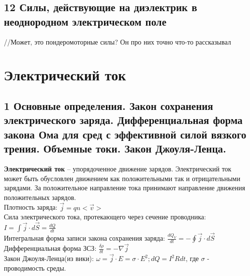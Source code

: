 \documentclass[a4paper,12pt]{article}
\begin{document}
\subsection{12   Силы, действующие на диэлектрик в неоднородном электрическом поле}
//Может, это пондеромоторные силы? Он про них точно что-то рассказывал


\section{Электрический ток}
\subsection{1   Основные определения. Закон сохранения электрического заряда. Дифференциальная форма закона Ома для сред с эффективной силой вязкого трения. Объемные токи. Закон Джоуля-Ленца.}
\textbf{Электрический ток} – упорядоченное движение зарядов. Электрический ток может быть обусловлен движением как положительными так и отрицательными зарядами. За положительное направление тока принимают направление движения положительных зарядов.\\
Плотность заряда: $\vec{j} = qn<\vec{v}>$\\
Сила электрического тока, протекающего через сечение проводника: $I = \int \vec{j} \cdot d\vec{S} = \frac{dQ}{dt}$\\
Интегральная форма записи закона сохранения заряда: $\frac{dQ_V}{dt} = - \oint \vec{j} \cdot d\vec{S}$\\
Дифференциальная форма ЗСЗ: $\frac{\delta \rho}{\delta t} = - \nabla \vec{j}$\\
Закон Джоуля-Ленца(из вики): $\omega = \vec{j} \cdot E = \sigma \cdot E^2; dQ = I^2Rdt$, где $\sigma$ - проводимость среды.
\end{document}
